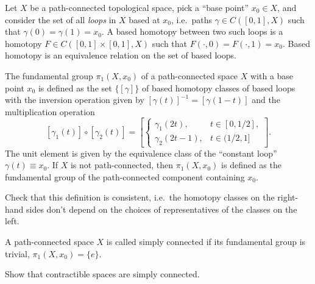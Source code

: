 \documentclass[english,letterpaper]{article}%
\numberwithin{equation}{section}
\numberwithin{figure}{section}
\numberwithin{table}{section}
\theoremstyle{definition}
\theoremstyle{definition}
\theoremstyle{definition}
\theoremstyle{plain}
\theoremstyle{plain}
\theoremstyle{plain}
\theoremstyle{plain}
\theoremstyle{remark}
\theoremstyle{remark}
\begin{document}
\begin{defn}
Let $X$ be a path-connected topological space, pick a ``base point'' $x_0\in X$, and consider the set of all \emph{loops} in $X$ based at $x_0$, i.e.\ paths $\gamma\in C([0,1], X)$ such that $\gamma(0)=\gamma(1)=x_0$. A based homotopy between two such loops is a homotopy $F\in C([0,1]\times[0,1],X)$ such that $F(\cdot,0)=F(\cdot,1)=x_0$. Based homotopy is an equivalence relation on the set of based loops.
\end{defn}

\begin{defn}
The fundamental group $\pi_1(X,x_0)$ of a path-connected space $X$ with a base point $x_0$ is defined as the set $\{ [\gamma]\}$ of based homotopy classes of based loops with the inversion operation given by $[\gamma(t)]^{-1}=[\gamma(1-t)]$ and the multiplication operation 
\[
[\gamma_1(t)]\circ [\gamma_2(t)]=\left[ \begin{cases} \gamma_1(2t), & t\in[0,1/2], \\ \gamma_2(2t-1), & t\in(1/2,1] \end{cases}\right].\label{pi1 group op}
\]
The unit element is given by the equivalence class of the ``constant loop'' $\gamma(t)\equiv x_0$. If $X$ is not path-connected, then $\pi_1(X,x_0)$ is defined as the fundamental group of the path-connected component containing $x_0$.
\end{defn}

\begin{xca}
Check that this definition is consistent, i.e.\ the homotopy classes on the right-hand sides don't depend on the choices of representatives of the classes on the left.
\end{xca}
\begin{defn}
A path-connected space $X$ is called simply connected if its fundamental group is trivial, $\pi_1(X,x_0)=\{e\}$.
\end{defn}

\begin{xca}
Show that contractible spaces are simply connected.
\end{xca}
\end{document}

